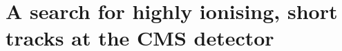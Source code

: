 \documentclass[
twoside=true,
headsepline,     %
headings=normal,
open=right,
numbers=noenddot, %
a4paper,
11pt
]{scrreprt} %
\begin{document}
% 

 \part{A search for highly ionising, short tracks at the CMS detector}  \label{part:analysis}
 
 
 
 
 
 
 
 
 
 

%  

% 

\cleardoublepage 
\appendix
% 



\cleardoublepage 




% 
\end{document}

